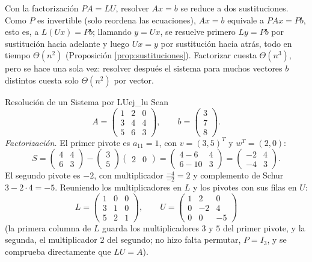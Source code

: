 \documentclass[11pt, a4paper]{article}
\begin{document}
Con la factorización $PA = LU$, resolver $Ax = b$ se reduce a dos sustituciones. Como $P$ es invertible (solo reordena las ecuaciones), $Ax = b$ equivale a $PAx = Pb$, esto es, a $L(Ux) = Pb$; llamando $y = Ux$, se resuelve primero $Ly = Pb$ por sustitución hacia adelante y luego $Ux = y$ por sustitución hacia atrás, todo en tiempo $\Theta(n^2)$ (Proposición \ref{prop:sustituciones}). Factorizar cuesta $\Theta(n^3)$, pero se hace una sola vez: resolver después el sistema para muchos vectores $b$ distintos cuesta solo $\Theta(n^2)$ por vector.

\begin{ejemplo}{Resolución de un Sistema por LU}{ej_lu}
Sean
\[
A = \begin{pmatrix} 1 & 2 & 0 \\ 3 & 4 & 4 \\ 5 & 6 & 3 \end{pmatrix}, \qquad b = \begin{pmatrix} 3 \\ 7 \\ 8 \end{pmatrix}.
\]
\textit{Factorización.} El primer pivote es $a_{11} = 1$, con $v = (3, 5)^T$ y $w^T = (2, 0)$:
\[
S = \begin{pmatrix} 4 & 4 \\ 6 & 3 \end{pmatrix} - \begin{pmatrix} 3 \\ 5 \end{pmatrix} \begin{pmatrix} 2 & 0 \end{pmatrix}
= \begin{pmatrix} 4 - 6 & 4 \\ 6 - 10 & 3 \end{pmatrix} = \begin{pmatrix} -2 & 4 \\ -4 & 3 \end{pmatrix}.
\]
El segundo pivote es $-2$, con multiplicador $\frac{-4}{-2} = 2$ y complemento de Schur $3 - 2 \cdot 4 = -5$. Reuniendo los multiplicadores en $L$ y los pivotes con sus filas en $U$:
\[
L = \begin{pmatrix} 1 & 0 & 0 \\ 3 & 1 & 0 \\ 5 & 2 & 1 \end{pmatrix}, \qquad
U = \begin{pmatrix} 1 & 2 & 0 \\ 0 & -2 & 4 \\ 0 & 0 & -5 \end{pmatrix}
\]
(la primera columna de $L$ guarda los multiplicadores $3$ y $5$ del primer pivote, y la segunda, el multiplicador $2$ del segundo; no hizo falta permutar, $P = I_3$, y se comprueba directamente que $LU = A$).


\end{ejemplo}
\end{document}
